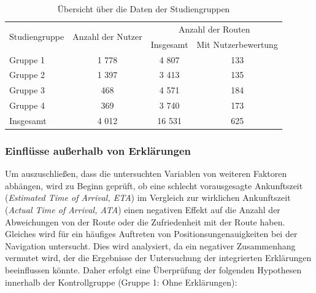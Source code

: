 \begin{table}[htb!]
    \centering
    \begin{tabular}{p{} c c c}
        \hline
        \multirow{2}{*}{Studiengruppe} & \multirow{2}{*}{Anzahl der Nutzer} & \multicolumn{2}{c}{Anzahl der Routen} \\
        & & Insgesamt & Mit Nutzerbewertung \\
        \toprule
        Gruppe 1            & 1 778 & 4 807  & 133 \\
        Gruppe 2            & 1 397 & 3 413  & 135 \\
        Gruppe 3            & 468   & 4 571  & 184 \\
        Gruppe 4            & 369   & 3 740  & 173 \\
        \midrule
        Insgesamt           & 4 012 & 16 531 & 625 \\ 
        \toprule
    \end{tabular}
    \caption{Übersicht über die Daten der Studiengruppen}
    \label{tab:study_user_group_overview}
\end{table}

\subsubsection{Einflüsse außerhalb von Erklärungen}
\label{sec:evaluation_other_dependencies}

Um auszuschließen, dass die untersuchten Variablen von weiteren Faktoren abhängen, wird zu Beginn geprüft, ob eine schlecht vorausgesagte Ankunftszeit (\textit{Estimated Time of Arrival, ETA}) im Vergleich zur wirklichen Ankunftszeit (\textit{Actual Time of Arrival, ATA}) einen negativen Effekt auf die Anzahl der Abweichungen von der Route oder die Zufriedenheit mit der Route haben. Gleiches wird für ein häufiges Auftreten von Positionsungenauigkeiten bei der Navigation untersucht. Dies wird analysiert, da ein negativer Zusammenhang vermutet wird, der die Ergebnisse der Untersuchung der integrierten Erklärungen beeinflussen könnte. Daher erfolgt eine Überprüfung der folgenden Hypothesen innerhalb der Kontrollgruppe (Gruppe 1: Ohne Erklärungen):

